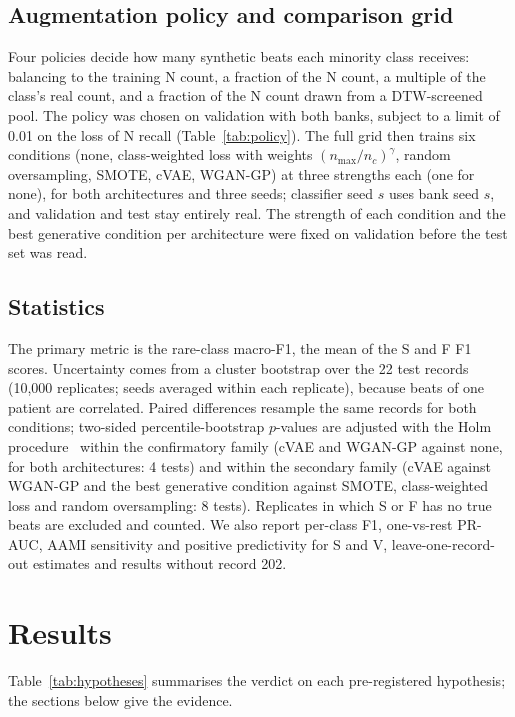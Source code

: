 \documentclass[11pt]{article}
\begin{document}
\subsection{Augmentation policy and comparison grid}
Four policies decide how many synthetic beats each minority class receives: balancing to the training N count,
a fraction of the N count, a multiple of the class's real count, and a fraction of the N count drawn from a
DTW-screened pool. The policy was chosen on validation with both banks, subject to a limit of 0.01 on the loss of
N recall (Table~\ref{tab:policy}). The full grid then trains six conditions (none, class-weighted loss with
weights $(n_{\max}/n_c)^{\gamma}$, random oversampling, SMOTE, cVAE, WGAN-GP) at three strengths each (one for
none), for both architectures and three seeds; classifier seed $s$ uses bank seed $s$, and validation and test
stay entirely real. The strength of each condition and the best generative condition per architecture were
fixed on validation before the test set was read.
\begin{table}[htbp]\centering\small{}\caption{Augmentation policies (pilot, validation).}\label{tab:policy}\end{table}

\subsection{Statistics}
The primary metric is the rare-class macro-F1, the mean of the S and F F1 scores. Uncertainty comes from a
cluster bootstrap over the 22 test records (10{,}000 replicates; seeds averaged within each replicate), because
beats of one patient are correlated. Paired differences resample the same records for both conditions;
two-sided percentile-bootstrap $p$-values are adjusted with the Holm procedure~\cite{holm1979} within the
confirmatory family (cVAE and WGAN-GP against none, for both architectures: 4 tests) and within the secondary
family (cVAE against WGAN-GP and the best generative condition against SMOTE, class-weighted loss and random
oversampling: 8 tests). Replicates in which S or F has no true beats are excluded and counted. We also report
per-class F1, one-vs-rest PR-AUC, AAMI sensitivity and positive predictivity for S and V, leave-one-record-out
estimates and results without record 202.

\section{Results}
Table~\ref{tab:hypotheses} summarises the verdict on each pre-registered hypothesis; the sections below give the
evidence.
\begin{table}[htbp]\centering\small{}\caption{Pre-registered hypotheses and their verdicts, computed from the result files by the registered criteria.}\label{tab:hypotheses}\end{table}
\end{document}
